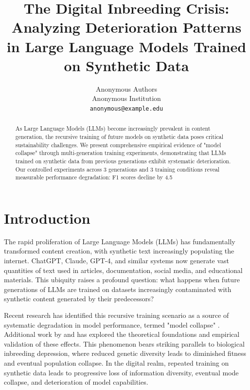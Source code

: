 \documentclass{article}
\title{The Digital Inbreeding Crisis: Analyzing Deterioration Patterns in Large Language Models Trained on Synthetic Data}
\author{%
  Anonymous Authors\\
  Anonymous Institution\\
  \texttt{anonymous@example.edu} \\
}
\begin{document}
\maketitle

\begin{abstract}
As Large Language Models (LLMs) become increasingly prevalent in content generation, the recursive training of future models on synthetic data poses critical sustainability challenges. We present comprehensive empirical evidence of "model collapse" through multi-generation training experiments, demonstrating that LLMs trained on synthetic data from previous generations exhibit systematic deterioration. Our controlled experiments across 3 generations and 3 training conditions reveal measurable performance degradation: F1 scores decline by 4.5%
\end{abstract}

\section{Introduction}

The rapid proliferation of Large Language Models (LLMs) has fundamentally transformed content creation, with synthetic text increasingly populating the internet. ChatGPT, Claude, GPT-4, and similar systems now generate vast quantities of text used in articles, documentation, social media, and educational materials. This ubiquity raises a profound question: what happens when future generations of LLMs are trained on datasets increasingly contaminated with synthetic content generated by their predecessors?

Recent research has identified this recursive training scenario as a source of systematic degradation in model performance, termed "model collapse" \cite{shumailov2023curse}. Additional work by \cite{gerstgrasser2024model} and \cite{alemohammad2023self} has explored the theoretical foundations and empirical validation of these effects. This phenomenon bears striking parallels to biological inbreeding depression, where reduced genetic diversity leads to diminished fitness and eventual population collapse. In the digital realm, repeated training on synthetic data leads to progressive loss of information diversity, eventual mode collapse, and deterioration of model capabilities.
\end{document}
